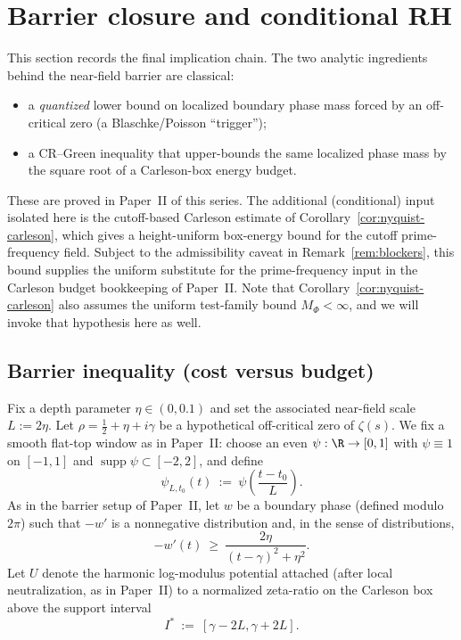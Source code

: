 \documentclass[11pt]{article}
\begin{document}
\section{Barrier closure and conditional RH}\label{sec:closure}

This section records the final implication chain.
The two analytic ingredients behind the near-field barrier are classical:
\begin{itemize}
\item a \emph{quantized} lower bound on localized boundary phase mass forced by an off-critical zero (a Blaschke/Poisson ``trigger'');
\item a CR--Green inequality that upper-bounds the same localized phase mass by the square root of a Carleson-box energy budget.
\end{itemize}
These are proved in Paper~II of this series.
The additional (conditional) input isolated here is the cutoff-based Carleson estimate of Corollary~\ref{cor:nyquist-carleson}, which gives a height-uniform box-energy bound for the cutoff prime-frequency field.
Subject to the admissibility caveat in Remark~\ref{rem:blockers}, this bound supplies the uniform substitute for the prime-frequency input in the Carleson budget bookkeeping of Paper~II.
Note that Corollary~\ref{cor:nyquist-carleson} also assumes the uniform test-family bound $M_\Phi<\infty$, and we will invoke that hypothesis here as well.

\subsection*{Barrier inequality (cost versus budget)}
Fix a depth parameter $\eta\in(0,0.1)$ and set the associated near-field scale $L:=2\eta$.
Let $\rho=\tfrac12+\eta+i\gamma$ be a hypothetical off-critical zero of $\zeta(s)$.
We fix a smooth flat-top window as in Paper~II: choose an even $\psi:\R\to[0,1]$ with $\psi\equiv 1$ on $[-1,1]$ and $\operatorname{supp}\psi\subset[-2,2]$, and define
\[
  \psi_{L,t_0}(t)\ :=\ \psi\!\left(\frac{t-t_0}{L}\right).
\]
As in the barrier setup of Paper~II, let $w$ be a boundary phase (defined modulo $2\pi$) such that $-w'$ is a nonnegative distribution and, in the sense of distributions,
\[
  -w'(t)\ \ge\ \frac{2\eta}{(t-\gamma)^2+\eta^2}.
\]
Let $U$ denote the harmonic log-modulus potential attached (after local neutralization, as in Paper~II) to a normalized zeta-ratio on the Carleson box above the support interval
\[
  I^\ast\ :=\ [\gamma-2L,\gamma+2L].
\]
\end{document}
